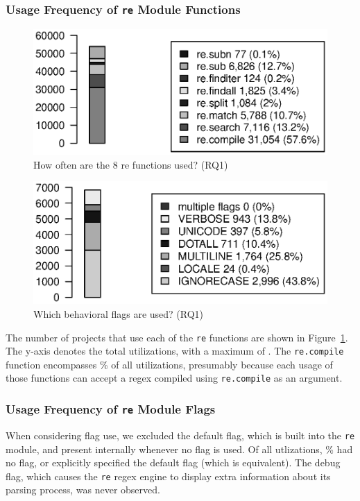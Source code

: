 

\subsubsection{Usage Frequency of {\tt re} Module Functions}

\begin{figure}[tb]
\centering
\includegraphics[width=\columnwidth]{../analysis_output/partFunctions.eps}
\caption{How often are the 8 re functions used? (RQ1)}
\label{fig:partFunctions}
\end{figure}

\begin{figure}[tb]
\centering
\includegraphics[width=\columnwidth]{../analysis_output/partFlags.eps}
\caption{Which behavioral flags are used? (RQ1)}
\label{fig:partFlags}
\end{figure}

The number of projects that use each of the {\tt re} functions are shown in Figure~\ref{fig:partFunctions}.  The y-axis denotes the total utilizations, with a maximum of . The {\tt re.compile} function encompasses \% of all utilizations, presumably because each usage of those functions can accept a regex compiled using {\tt re.compile} as an argument.

\subsubsection{Usage Frequency of {\tt re} Module Flags}
When considering flag use, we excluded the default flag, which is built into the {\tt re} module, and present internally whenever no flag is used.  Of all utlizations, \% had no flag, or explicitly specified the default flag (which is equivalent).  The debug flag, which causes the {\tt re} regex engine to display extra information about its parsing process, was never observed.

